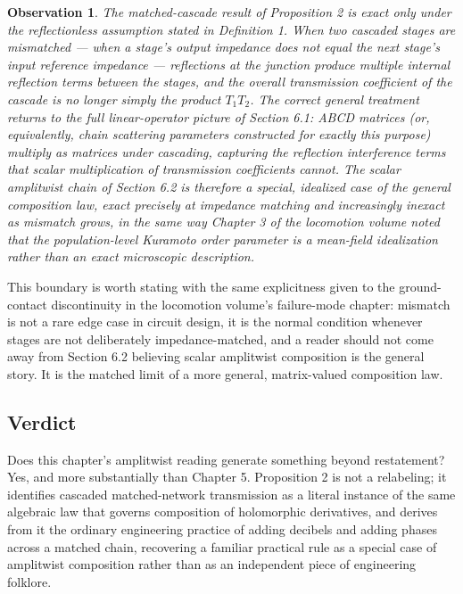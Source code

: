 \documentclass[12pt]{article}
\newtheorem{observation}{Observation}
\begin{document}
\begin{observation}
The matched-cascade result of Proposition 2 is exact only under the reflectionless assumption stated in Definition 1. When two cascaded stages are mismatched — when a stage's output impedance does not equal the next stage's input reference impedance — reflections at the junction produce multiple internal reflection terms between the stages, and the overall transmission coefficient of the cascade is no longer simply the product $T_1 T_2$. The correct general treatment returns to the full linear-operator picture of Section 6.1: ABCD matrices (or, equivalently, chain scattering parameters constructed for exactly this purpose) multiply as matrices under cascading, capturing the reflection interference terms that scalar multiplication of transmission coefficients cannot. The scalar amplitwist chain of Section 6.2 is therefore a special, idealized case of the general composition law, exact precisely at impedance matching and increasingly inexact as mismatch grows, in the same way Chapter 3 of the locomotion volume noted that the population-level Kuramoto order parameter is a mean-field idealization rather than an exact microscopic description.
\end{observation}

This boundary is worth stating with the same explicitness given to the ground-contact discontinuity in the locomotion volume's failure-mode chapter: mismatch is not a rare edge case in circuit design, it is the normal condition whenever stages are not deliberately impedance-matched, and a reader should not come away from Section 6.2 believing scalar amplitwist composition is the general story. It is the matched limit of a more general, matrix-valued composition law.

\subsection{Verdict}

Does this chapter's amplitwist reading generate something beyond restatement? Yes, and more substantially than Chapter 5. Proposition 2 is not a relabeling; it identifies cascaded matched-network transmission as a literal instance of the same algebraic law that governs composition of holomorphic derivatives, and derives from it the ordinary engineering practice of adding decibels and adding phases across a matched chain, recovering a familiar practical rule as a special case of amplitwist composition rather than as an independent piece of engineering folklore.
\end{document}
